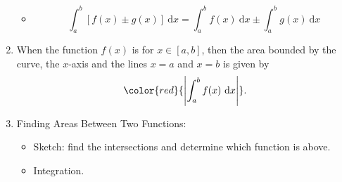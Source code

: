 \documentclass[12pt, a4paper]{article}
\def\d{{\mathrm{d}}}
\begin{document}
\begin{enumerate}
\begin{itemize}
        \item $$\int_a^b\left[f(x)\pm g(x)\right]\ \d x=\int_a^bf(x)\ \d x\pm\int_a^bg(x)\ \d x$$
    \end{itemize}
    \item When the function $f(x)$ is {\color{red}{negative}} for $x\in\left[a,b\right]$, then the area bounded by the curve, the $x$-axis and the lines $x=a$ and $x=b$ is given by 
    $${\color{red}{\left|\int_a^bf(x)\ \d x\right|}}.$$
    \item Finding Areas Between Two Functions: 
    \begin{itemize}
        \item Sketch: find the intersections and determine which function is above.
        \item Integration.
    \end{itemize}
\end{enumerate}
\end{document}
